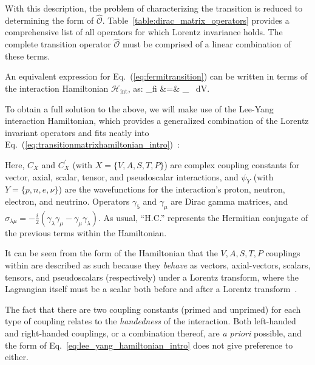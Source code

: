 With this description, the problem of characterizing the transition is reduced to determining the form of $\mathcal{\hat{O}}$.  %
Table~\ref{table:dirac_matrix_operators} provides a comprehensive list of all operators for which Lorentz invariance holds.  The complete transition operator $\mathcal{\hat{O}}$ must be comprised of a linear combination of these terms.  


An equivalent expression for Eq.~(\ref{eq:fermitransition}) can be written in terms of the interaction Hamiltonian $\mathcal{H}_{\mathrm{int}}$, as:
\bea
{}_{fi} &=& \int \! _{} \, \textrm{d}V. 
\label{eq:transitionmatrixhamiltonian_intro}
\eea 

To obtain a full solution to the above, we will make use of the Lee-Yang interaction Hamiltonian, which provides a generalized combination of the Lorentz invariant operators and fits neatly into Eq.~(\ref{eq:transitionmatrixhamiltonian_intro})~\cite{LeeYang}:

Here, $C_X$ and $C_X^{\prime}$ (with $X=\{V,A,S,T,P\}$) are complex coupling constants for vector, axial, scalar, tensor, and pseudoscalar interactions, and $\psi_Y$ (with $Y=\{p,n,e,\nu\}$) are the wavefunctions for the interaction's proton, neutron, electron, and neutrino.  Operators $\gamma_5$ and $\gamma_\mu$ are Dirac gamma matrices, and $\mbox{$\sigma_{\lambda\mu} = -\frac{i}{2}(\gamma_\lambda \gamma_\mu - \gamma_\mu\gamma_\lambda )$}$.  As usual, ``H.C.'' represents the Hermitian conjugate of the previous terms within the Hamiltonian.

It can be seen from the form of the Hamiltonian that the $V,A,S,T,P$ couplings within are described as such because they \emph{behave} as vectors, axial-vectors, scalars, tensors, and pseudoscalars (respectively) under a Lorentz transform, where the Lagrangian itself must be a scalar both before and after a Lorentz transform~\cite{LeeYang,Falkowski2021,hong_sternberg_garcia}.

The fact that there are two coupling constants (primed and unprimed) for each type of coupling relates to the \emph{handedness} of the interaction.  Both left-handed and right-handed couplings, or a combination thereof, are \emph{a priori} possible, and the form of Eq.~\ref{eq:lee_yang_hamiltonian_intro} does not give preference to either.

